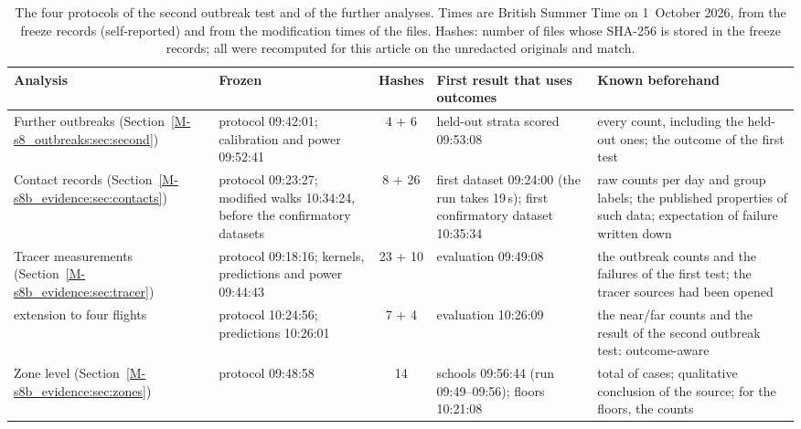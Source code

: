 \begin{table}[tbp]
  \centering\footnotesize
  \caption{The four protocols of the second outbreak test and of the further analyses. Times are British Summer Time on 1~October 2026, from the
  freeze records (self-reported) and from the modification times of the files. Hashes: number of files whose
  SHA-256 is stored in the freeze records; all were recomputed for this article on the unredacted originals
  and match.}
  \label{appS_prot2:tab:freeze}
  \setlength{\tabcolsep}{4pt}
  \begin{tabular}{@{}>{\raggedright\arraybackslash}p{}>{\raggedright\arraybackslash}p{}c>{\raggedright\arraybackslash}p{}>{\raggedright\arraybackslash}p{}@{}}
    \toprule
    Analysis & Frozen & Hashes & First result that uses outcomes & Known beforehand \\
    \midrule
    Further outbreaks (Section~\ref{M-s8_outbreaks:sec:second}) &
      protocol 09:42:01; calibration and power 09:52:41 & 4 + 6 &
      held-out strata scored 09:53:08 &
      every count, including the held-out ones; the outcome of the first test \\
    Contact records (Section~\ref{M-s8b_evidence:sec:contacts}) &
      protocol 09:23:27; modified walks 10:34:24, before the confirmatory datasets & 8 + 26 &
      first dataset 09:24:00 (the run takes 19\,s); first confirmatory dataset 10:35:34 &
      raw counts per day and group labels; the published properties of such data; expectation of failure
      written down \\
    Tracer measurements (Section~\ref{M-s8b_evidence:sec:tracer}) &
      protocol 09:18:16; kernels, predictions and power 09:44:43 & 23 + 10 &
      evaluation 09:49:08 &
      the outbreak counts and the failures of the first test; the tracer sources had been opened \\
    \quad extension to four flights &
      protocol 10:24:56; predictions 10:26:01 & 7 + 4 &
      evaluation 10:26:09 &
      the near/far counts and the result of the second outbreak test: outcome-aware \\
    Zone level (Section~\ref{M-s8b_evidence:sec:zones}) &
      protocol 09:48:58 & 14 &
      schools 09:56:44 (run 09:49--09:56); floors 10:21:08 &
      total of cases; qualitative conclusion of the source; for the floors, the counts \\
    \bottomrule
  \end{tabular}
\end{table}

